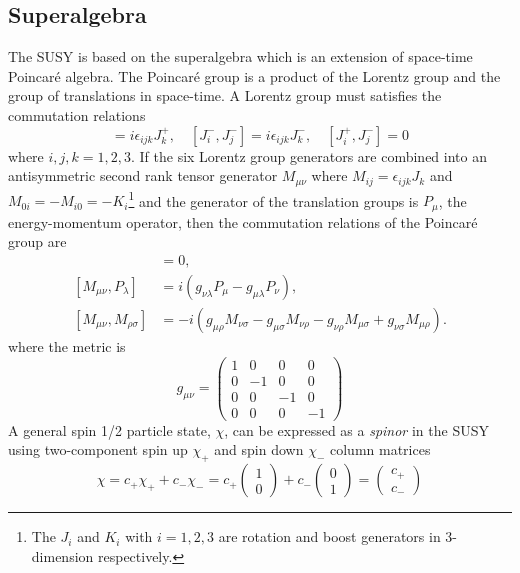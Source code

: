 \subsection{Superalgebra}
\label{subsec:susy_superalgebra}
The SUSY is based on the superalgebra which is an extension of space-time Poincar\'{e} algebra.
The Poincar\'{e} group is a product of the Lorentz group and the group of translations in space-time.
A Lorentz group must satisfies the commutation relations
%
\begin{equation}
[J^{+}_{i}, J^{+}_{j}] = i \epsilon_{ijk} J^{+}_{k}, \quad 
[J^{-}_{i}, J^{-}_{j}] = i \epsilon_{ijk} J^{-}_{k}, \quad 
[J^{+}_{i}, J^{-}_{j}] = 0
\label{eq:susy_Lorentz_commutation_relations}
\end{equation}
%
where $i, j, k = 1, 2, 3$.
If the six Lorentz group generators are combined into an antisymmetric second rank tensor generator $M_{\mu\nu}$ where $M_{ij} = \epsilon_{ijk}J_{k}$ and $M_{0i} = -M_{i0} = -K_{i}$\footnote{The $J_{i}$ and $K_{i}$ with $i=1,2,3$ are rotation and boost generators in 3-dimension respectively.} and the generator of the translation groups is $P_{\mu}$, the energy-momentum operator, then the commutation relations of the Poincar\'{e} group are
%
\begin{align}
[P_{\mu}, P_{\nu}] &= 0 ,\\
[M_{\mu \nu}, P_{\lambda}] &= i (g_{\nu \lambda} P_{\mu} - g_{\mu \lambda} P_{\nu}) ,\\
[M_{\mu \nu}, M_{\rho \sigma}] &= -i (g_{\mu \rho} M_{\nu \sigma} - g_{\mu \sigma} M_{\nu \rho} - g_{\nu \rho} M_{\mu \sigma} + g_{\nu \sigma} M_{\mu \rho}) .
\label{eq:susy_Poincare_commutation_relations}
\end{align}
where the metric is 
\begin{equation}
g_{\mu \nu} =
\left(
\begin{array}{cccc}
1 & 0 & 0 & 0\\
0 & -1 & 0 & 0\\
0 & 0 & -1 & 0\\
0 & 0 & 0 & -1   
\end{array}
\right)
\label{eq:susy_metric}
\end{equation}
%
A general spin 1/2 particle state, $\chi$, can be expressed as a \textit{spinor} in the SUSY using two-component spin up $\chi_{+}$ and spin down $\chi_{-}$ column matrices
%
\begin{equation}
\chi = c_{+} \chi_{+} + c_{-} \chi_{-}
= c_{+} \left(\begin{matrix}1\\0\end{matrix}\right) + c_{-} \left(\begin{matrix}0\\1\end{matrix}\right)
= \left(\begin{matrix}c_{+}\\c_{-}\end{matrix}\right)
\label{eq:susy_spinor}
\end{equation}
